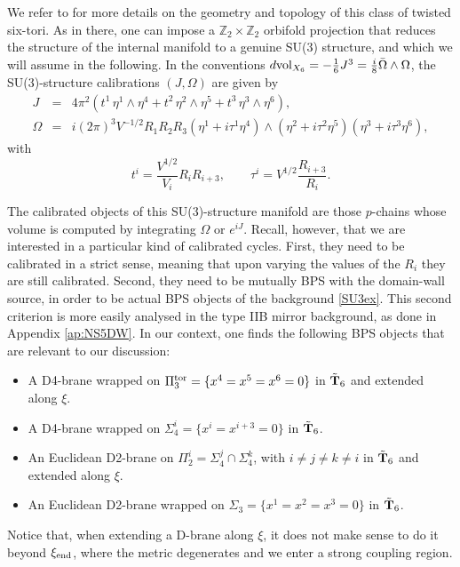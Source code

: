 \documentclass[11pt]{article}
\def\be{\begin{equation}}
\def\ee{\end{equation}}
\def\bea{\begin{eqnarray}}
\def\eea{\end{eqnarray}}
\def\Om{\Omega}
\newcommand{\IZ}{\mathbb{Z}}
\begin{document}
We refer to \cite{Marchesano:2006ns} for more details on the geometry and topology of this class of twisted six-tori. As in there, one can impose a $\IZ_2 \times \IZ_2$ orbifold projection that reduces the structure of the internal manifold to a genuine SU(3) structure, and which we will assume in the following. In the conventions $d{\rm vol}_{X_6} = -\frac{1}{6} J^3 = \frac{i}{8} \bar{\Omega} \wedge \Omega$, the SU(3)-structure calibrations $(J,\Omega)$ are given by
\bea
\label{Jex}
J & = & 4\pi^2 \left( t^1 \,\eta^1 \wedge \eta^4 +t^2\, \eta^2 \wedge \eta^5  + t^3 \,\eta^3 \wedge \eta^6 \right) , \\
\Om & = & {i} (2\pi)^3 V^{-1/2} R_1R_2R_3 \left( \eta^1 + i  \tau^1 \eta^4 \right) \wedge \left( \eta^2 + i \tau^2 \eta^5 \right) \left( \eta^3 + i \tau^3 \eta^6 \right) ,
\label{Omex}
\eea
with
\be
\label{defttau}
t^i = \frac{V^{1/2}}{V_i} R_iR_{i+3} , \qquad  \tau^i = V^{1/2} \frac{R_{i+3}}{R_i} .
\ee

The calibrated objects of this SU(3)-structure manifold are those $p$-chains whose volume is computed by integrating $\Omega$ or $e^{iJ}$. Recall, however, that we are interested in a particular kind of calibrated cycles. First, they need to be calibrated in a strict sense, meaning that upon varying the values of the $R_i$ they are still calibrated. Second, they need to be mutually BPS with the domain-wall source, in order to be actual BPS objects of the background \eqref{SU3ex}. This second criterion is more easily analysed in the type IIB mirror background, as done in Appendix \ref{ap:NS5DW}. In our context, one finds the following BPS objects that are relevant to our discussion:

\begin{itemize}

\item[-] A D4-brane wrapped on $\Pi_3^{\rm tor} = \{ x^4=x^5=x^6=0\}$ in $\tilde{\bf T}_6$ and extended along $\xi$.  

\item[-] A D4-brane wrapped on $\Sigma_4^i = \{ x^i = x^{i+3} = 0\}$ in $\tilde{\bf T}_6$.

\item[-] An Euclidean D2-brane on $\Pi_2^i = \Sigma_4^j \cap \Sigma_4^k$, with $i \neq j \neq k \neq i$ in $\tilde{\bf T}_6$ and extended along $\xi$.

\item[-] An Euclidean D2-brane wrapped on $\Sigma_3 = \{ x^1=x^2=x^3=0\}$ in $\tilde{\bf T}_6$.

\end{itemize}
Notice that, when extending a D-brane along $\xi$, it does not make sense to do it beyond  $\xi_{\rm end}$, where the metric degenerates and we enter a strong coupling region. 
\end{document}

